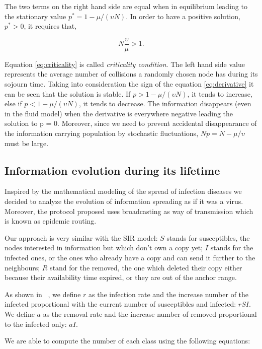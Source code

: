 The two terms on the right hand side are equal when in equilibrium leading to
the stationary value $p^* = 1 - \mu / (\upsilon N)$. In order to have a positive
solution, $p^* > 0$, it requires that,

\begin{equation}
N\frac{\upsilon}{\mu} > 1. \label{eq:criticality}
\end{equation}

Equation \eqref{eq:criticality} is called {\it criticality condition}. The left
hand side value represents the average number of collisions a randomly chosen
node has during its sojourn time. Taking into consideration the sign of
the equation \eqref{eq:derivative} it can be seen that the solution is stable.
If $p > 1 - \mu / (\upsilon N)$, it tends to increase, else if $p < 1 - \mu /
(\upsilon N)$, it tends to decrease. The information disappears (even in the
fluid model) when the derivative is everywhere negative leading the solution to
p = 0. Moreover, since we need to prevent accidental disappearance of the
information carrying population by stochastic fluctuations, $Np = N - \mu /
\upsilon$ must be large.

\subsection{Information evolution during its lifetime}
\label{sec:sir_model}
Inspired by the mathematical modeling of the spread of infection diseases
\cite{hethcote2000mathematics} we decided to analyze the evolution of
information spreading as if it was a virus. Moreover, the protocol proposed uses
broadcasting as way of transmission which is known as epidemic routing.

Our approach is very similar with the SIR model: $S$ stands for susceptibles,
the nodes interested in information but which don't own a copy yet; $I$
stands for the infected ones, or the ones who already have a copy and can send
it further to the neighbours; $R$ stand for the removed, the one which deleted
their copy either because their availability time expired, or they are out of
the anchor range.

As shown in ~\cite{hethcote2000mathematics}, we define $r$ as the infection rate
and the increase number of the infected proportional with the current number of 
susceptibles and infected: $rSI$. We define $a$ as the removal rate and the
increase number of removed proportional to the infected only: $aI$.

We are able to compute the number of each class using the following equations:

